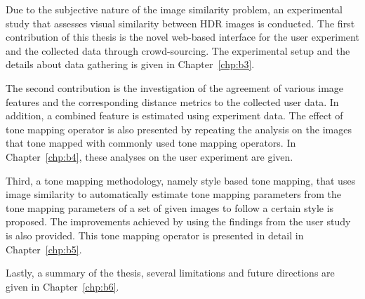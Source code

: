 Due to the subjective nature of the image similarity problem, an experimental study that assesses visual similarity between HDR images is conducted. The first contribution of this thesis is the novel web-based interface for the user experiment and the collected data through crowd-sourcing. The experimental setup and the details about data gathering is given in Chapter~\ref{chp:b3}.


The second contribution is the investigation of the agreement of various image features and the corresponding distance metrics to the collected user data. In addition, a combined feature is estimated using experiment data. The effect of tone mapping operator is also presented by repeating the analysis on the images that tone mapped with commonly used tone mapping operators. In Chapter~\ref{chp:b4}, these analyses on the user experiment are given.

Third, a tone mapping methodology, namely style based tone mapping, that uses image similarity to automatically estimate tone mapping parameters from the tone mapping parameters of a set of given images to follow a certain style is proposed. The improvements achieved by using the findings from the user study is also provided. This tone mapping operator is presented in detail in Chapter~\ref{chp:b5}.

Lastly, a summary of the thesis, several limitations and future directions are given in Chapter~\ref{chp:b6}.






